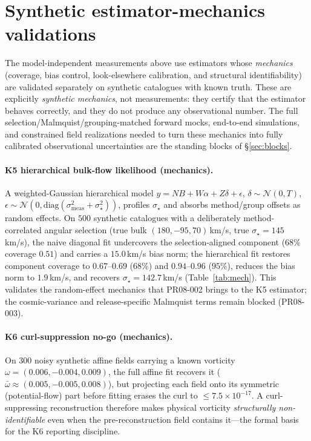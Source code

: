 \documentclass[11pt,a4paper]{article}
\theoremstyle{plain}
\theoremstyle{definition}
\begin{document}
\section{Synthetic estimator-mechanics validations}
\label{sec:mechanics}

The model-independent measurements above use estimators whose
\emph{mechanics} (coverage, bias control, look-elsewhere calibration,
and structural identifiability) are validated separately on synthetic
catalogues with known truth. These are explicitly \emph{synthetic
mechanics}, not measurements: they certify that the estimator behaves
correctly, and they do not produce any observational number. The full
selection/Malmquist/grouping-matched forward mocks, end-to-end
simulations, and constrained field realizations needed to turn these
mechanics into fully calibrated observational uncertainties are the
standing blocks of \S\ref{sec:blocks}.

\paragraph{K5 hierarchical bulk-flow likelihood (mechanics).}
A weighted-Gaussian hierarchical model
$y=NB+W\alpha+Z\delta+\epsilon$, $\delta\sim\mathcal N(0,T)$,
$\epsilon\sim\mathcal N(0,\mathrm{diag}(\sigma_{\mathrm{meas}}^2+\sigma_\star^2))$,
profiles $\sigma_\star$ and absorbs method/group offsets as random
effects. On $500$ synthetic catalogues with a deliberately
method-correlated angular selection (true bulk $(180,-95,70)$\,km/s,
true $\sigma_\star=145$\,km/s), the naive diagonal fit undercovers the
selection-aligned component ($68\%$ coverage $0.51$) and carries a
$15.0$\,km/s bias norm; the hierarchical fit restores component coverage
to $0.67$--$0.69$ ($68\%$) and $0.94$--$0.96$ ($95\%$), reduces the bias
norm to $1.9$\,km/s, and recovers $\sigma_\star=142.7$\,km/s
(Table~\ref{tab:mech}). This validates the random-effect mechanics that
PR08-002 brings to the K5 estimator; the cosmic-variance and
release-specific Malmquist terms remain blocked (PR08-003).

\paragraph{K6 curl-suppression no-go (mechanics).}
On $300$ noisy synthetic affine fields carrying a known vorticity
$\omega=(0.006,-0.004,0.009)$, the full affine fit recovers it
($\bar\omega\approx(0.005,-0.005,0.008)$), but projecting each field onto
its symmetric (potential-flow) part before fitting erases the curl to
$\le7.5\times10^{-17}$. A curl-suppressing reconstruction therefore makes
physical vorticity \emph{structurally non-identifiable} even when the
pre-reconstruction field contains it---the formal basis for the K6
reporting discipline.
\end{document}
